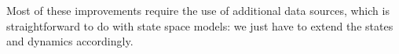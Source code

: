 Most of these improvements require the use of additional data sources, which is straightforward to do with state space models: we just have to extend the states and dynamics accordingly. 
